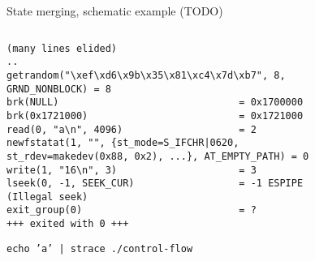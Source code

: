 \begin{frame}[fragile]
\begin{columns}[t]
\begin{column}{0.6\textwidth}
\begin{figure}
				\caption{State merging, schematic example (TODO)}
			\end{figure}

		\end{column}
	\end{columns}


	{\tiny
	\begin{figure}
		\begin{lstlisting}
(many lines elided)
..
getrandom("\xef\xd6\x9b\x35\x81\xc4\x7d\xb7", 8, GRND_NONBLOCK) = 8
brk(NULL)                               = 0x1700000
brk(0x1721000)                          = 0x1721000
read(0, "a\n", 4096)                    = 2
newfstatat(1, "", {st_mode=S_IFCHR|0620, st_rdev=makedev(0x88, 0x2), ...}, AT_EMPTY_PATH) = 0
write(1, "16\n", 3)                     = 3
lseek(0, -1, SEEK_CUR)                  = -1 ESPIPE (Illegal seek)
exit_group(0)                           = ?
+++ exited with 0 +++
\end{lstlisting}
		\caption{\texttt{echo 'a' | strace ./control-flow}}
	\end{figure}
	}
\end{frame}
